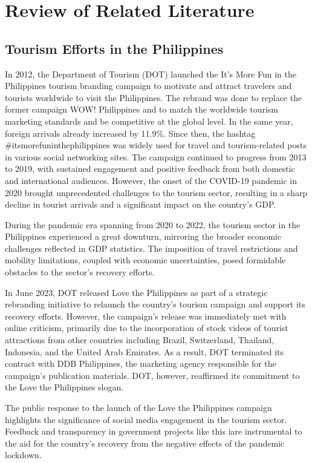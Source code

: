 \documentclass[journal]{./IEEE/IEEEtran}
\begin{document}
\section{Review of Related Literature}
\subsection*{Tourism Efforts in the Philippines}
In 2012, the Department of Tourism (DOT) launched the It’s More Fun in the Philippines tourism branding campaign to motivate and attract travelers and tourists worldwide to visit the Philippines. The rebrand was done to replace the former campaign WOW! Philippines and to match the worldwide tourism marketing standards and be competitive at the global level. In the same year, foreign arrivals already increased by 11.9\%. Since then, the hashtag \#itsmorefuninthephilippines was widely used for travel and tourism-related posts in various social networking sites.\cite{three:rappler-philippines-tourism} The campaign continued to progress from 2013 to 2019, with sustained engagement and positive feedback from both domestic and international audiences. However, the onset of the COVID-19 pandemic in 2020 brought unprecedented challenges to the tourism sector, resulting in a sharp decline in tourist arrivals and a significant impact on the country’s GDP.

During the pandemic era spanning from 2020 to 2022, the tourism sector in the Philippines experienced a great downturn, mirroring the broader economic challenges reflected in GDP statistics. The imposition of travel restrictions and mobility limitations, coupled with economic uncertainties, posed formidable obstacles to the sector’s recovery efforts.\cite{four:statista-philippines-tourism} 

In June 2023, DOT released Love the Philippines as part of a strategic rebranding initiative to relaunch the country’s tourism campaign and support its recovery efforts. However, the campaign’s release was immediately met with online criticism, primarily due to the incorporation of stock videos of tourist attractions from other countries including Brazil, Switzerland, Thailand, Indonesia, and the United Arab Emirates. As a result, DOT terminated its contract with DDB Philippines, the marketing agency responsible for the campaign’s publication materials. DOT, however, reaffirmed its commitment to the Love the Philippines slogan.\cite{five:mb-enhanced-tourism-slogan} 

The public response to the launch of the Love the Philippines campaign highlights the significance of social media engagement in the tourism sector. Feedback and transparency in government projects like this iare instrumental to the aid for the country’s recovery from the negative effects of the pandemic lockdown. 
\end{document}
